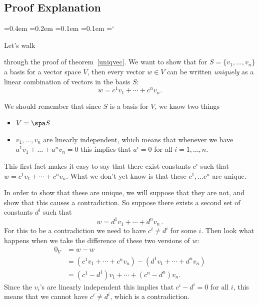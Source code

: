 
\subsection*{Proof Explanation}

{\ttfamily
{}\font=0.4em
\font=0.2em
\font=0.1em
\font=0.1em
\hyphenchar\font=`\-


\hypertarget{basis_and_dimension_thm}{Let's walk } through the proof of theorem~\ref{uniqvec}. We want to show that for $S=\{v_1, \ldots, v_n \}$ a basis for a vector space $V$, then every vector $w \in V$ can be written \emph{uniquely} as a linear combination of vectors in the basis $S$:
\[
w=c^1v_1+\cdots + c^nv_n.
\]

We should remember that since $S$ is a basis for $V$, we know two things
\begin{itemize}
\item $V = \spa S$
\item $ v_1, \ldots , v_n$ are linearly independent, which means that whenever we have 
$
a^1v_1+ \ldots + a^n v_n = 0
$
this implies that $a^i =0$ for all $i=1, \ldots, n$.
\end{itemize}
This first fact makes it easy to say that there exist constants $c^i$ such that $w=c^1v_1+\cdots + c^nv_n$. What we don't yet know is that these $c^1, \ldots c^n$ are unique.

 In order to show that these are unique, we will suppose that they are not, and show that this causes a contradiction. So suppose there exists a second set of constants $d^i$ such that 
\[w=d^1v_1+\cdots + d^nv_n\, .\] 
For this to be a contradiction we need to have $c^i \neq d^i$ for some $i$. Then look what happens when we take the difference of these two versions of $w$:
\begin{align*}
0_V&=w-w\\
&=(c^1v_1+\cdots + c^nv_n)-(d^1v_1+\cdots + d^nv_n )\\
&=(c^1-d^1)v_1+\cdots + (c^n-d^n)v_n.
\end{align*}
Since the $v_i$'s are linearly independent this implies that $c^i - d^i = 0$ for all $i$, this means that we cannot have $c^i \neq d^i$, which is a contradiction.



} %

